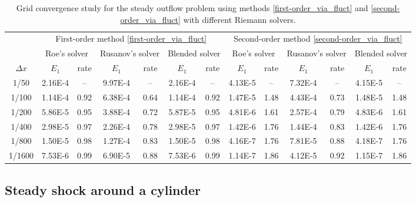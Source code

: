 \documentclass[preprint, 11pt]{article}
\begin{document}
\begin{table}[!ht]\scriptsize
  \begin{center}
    \begin{tabular}{||c||c|c||c|c||c|c||c|c||c|c||c|c||} \hline
      & \multicolumn{6}{c||}{First-order method \eqref{first-order_via_fluct}}
      & \multicolumn{6}{c||}{Second-order method \eqref{second-order_via_fluct}} \\ \cline{2-13}
      & \multicolumn{2}{c||}{Roe's solver}
      &\multicolumn{2}{c||}{Rusanov's solver}
      &\multicolumn{2}{c||}{Blended solver}
      & \multicolumn{2}{c||}{Roe's solver}
      &\multicolumn{2}{c||}{Rusanov's solver}
      &\multicolumn{2}{c||}{Blended solver}
      \\ \cline{2-13}
      $\Delta x$ & $E_1$ & rate & $E_1$ & rate & $E_1$ & rate & $E_1$ & rate & $E_1$ & rate & $E_1$ & rate\\ \hline
      1/50   & 2.16E-4 &  --  & 9.97E-4 &   -- & 2.16E-4 & --   & 4.13E-5 &   -- & 7.32E-4 &  --  & 4.15E-5 & --   \\
      1/100  & 1.14E-4 & 0.92 & 6.38E-4 & 0.64 & 1.14E-4 & 0.92 & 1.47E-5 & 1.48 & 4.43E-4 & 0.73 & 1.48E-5 & 1.48 \\
      1/200  & 5.86E-5 & 0.95 & 3.88E-4 & 0.72 & 5.87E-5 & 0.95 & 4.81E-6 & 1.61 & 2.57E-4 & 0.79 & 4.83E-6 & 1.61 \\
      1/400  & 2.98E-5 & 0.97 & 2.26E-4 & 0.78 & 2.98E-5 & 0.97 & 1.42E-6 & 1.76 & 1.44E-4 & 0.83 & 1.42E-6 & 1.76 \\
      1/800  & 1.50E-5 & 0.98 & 1.27E-4 & 0.83 & 1.50E-5 & 0.98 & 4.16E-7 & 1.76 & 7.81E-5 & 0.88 & 4.18E-7 & 1.76 \\
      1/1600 & 7.53E-6 & 0.99 & 6.90E-5 & 0.88 & 7.53E-6 & 0.99 & 1.14E-7 & 1.86 & 4.12E-5 & 0.92 & 1.15E-7 & 1.86 \\ \hline
    \end{tabular}
    \caption{Grid convergence study for the steady outflow problem
      using methods \eqref{first-order_via_fluct} and \eqref{second-order_via_fluct}
      with different Riemann solvers.\label{table:steady_outflow}}
  \end{center}
\end{table}

\subsection{Steady shock around a cylinder}\label{sec:bow_shock}
\end{document}

